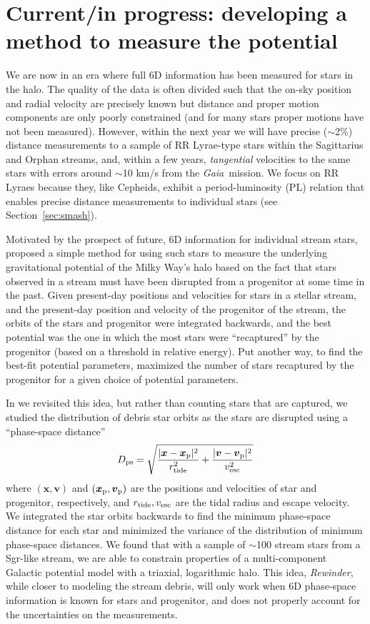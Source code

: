 \documentclass[letterpaper,12pt,preprint]{aastex}
\newcommand{\project}[1]{\textsl{#1}}
\newcommand{\gaia}{\project{Gaia}}
\newcommand{\rewinder}{\emph{Rewinder}}
\begin{document}
\section{Current/in progress: developing a method to measure the potential}
We are now in an era where full 6D information has been measured for stars in the halo. The quality of the data is often divided such that the on-sky position and radial velocity are precisely known but distance and proper motion components are only poorly constrained (and for many stars proper motions have not been measured). However, within the next year we will have precise ($\sim$2\%) distance measurements to a sample of RR Lyrae-type stars within the Sagittarius and Orphan streams, and, within a few years, \emph{tangential} velocities to the same stars with errors around $\sim$10 km/s from the \gaia\ mission. We focus on RR Lyraes because they, like Cepheids, exhibit a period-luminosity (PL) relation that enables precise distance measurements to individual stars (see Section~\ref{sec:smash}).

Motivated by the prospect of future, 6D information for individual stream stars, \cite{johnston99a} proposed a simple method for using such stars to measure the underlying gravitational potential of the Milky Way's halo based on the fact that stars observed in a stream must have been disrupted from a progenitor at some time in the past. Given present-day positions and velocities for stars in a stellar stream, and the present-day position and velocity of the progenitor of the stream, the orbits of the stars and progenitor were integrated backwards, and the best potential was the one in which the most stars were ``recaptured'' by the progenitor (based on a threshold in relative energy). Put another way, to find the best-fit potential parameters, \cite{johnston99a} maximized the number of stars recaptured by the progenitor for a given choice of potential parameters.

In \cite{apw13} we revisited this idea, but rather than counting stars that are captured, we studied the distribution of debris star orbits as the stars are disrupted using a ``phase-space distance''
\begin{equation}
	D_{\rm ps} = \sqrt{\frac{\vert{\boldsymbol{x} - \boldsymbol{x}_{\rm p}\vert^2}}{r^2_{\rm tide}} + 
				    \frac{\vert{\boldsymbol{v} - \boldsymbol{v}_{\rm p}\vert^2}}{v^2_{\rm esc}}}
\end{equation}
where $(\boldsymbol{x},\boldsymbol{v})$ and $(\boldsymbol{x}_{\rm p},\boldsymbol{v}_{\rm p})$ are the positions and velocities of star and progenitor, respectively, and $r_{\rm tide}, v_{\rm esc}$ are the tidal radius and escape velocity. We integrated the star orbits backwards to find the minimum phase-space distance for each star and minimized the variance of the distribution of minimum phase-space distances. We found that with a sample of $\sim$100 stream stars from a Sgr-like stream, we are able to constrain properties of a multi-component Galactic potential model with a triaxial, logarithmic halo. This idea, \rewinder, while closer to modeling the stream debris, will only work when 6D phase-space information is known for stars and progenitor, and does not properly account for the uncertainties on the measurements.
\end{document}
